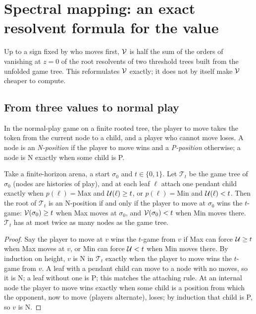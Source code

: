 \section{Spectral mapping: an exact resolvent formula for the value}\label{sec:spectral}

Up to a sign fixed by who moves first, $\mathcal{V}$ is half the sum of the orders of vanishing at $z=0$ of the root resolvents of two threshold trees built from the unfolded game tree. This reformulates $\mathcal{V}$ exactly; it does not by itself make $\mathcal{V}$ cheaper to compute.

\subsection{From three values to normal play}
In the normal-play game on a finite rooted tree, the player to move takes the token from the current node to a child, and a player who cannot move loses. A node is an \emph{N-position} if the player to move wins and a \emph{P-position} otherwise; a node is N exactly when some child is P.

\begin{lemma}\label{lem:threshold}
Take a finite-horizon arena, a start $\sigma_0$ and $t\in\{0,1\}$. Let $\mathcal T_t$ be the game tree of $\sigma_0$ (nodes are histories of play), and at each leaf $\ell$ attach one pendant child exactly when $p(\ell)=\mathrm{Max}$ and $\mathcal{U}(\ell)\ge t$, or $p(\ell)=\mathrm{Min}$ and $\mathcal{U}(\ell)<t$. Then the root of $\mathcal T_t$ is an N-position if and only if the player to move at $\sigma_0$ wins the $t$-game: $\mathcal{V}(\sigma_0)\ge t$ when Max moves at $\sigma_0$, and $\mathcal{V}(\sigma_0)<t$ when Min moves there. $\mathcal T_t$ has at most twice as many nodes as the game tree.
\end{lemma}

\begin{proof}
Say the player to move at $v$ wins the $t$-game from $v$ if Max can force $\mathcal{U}\ge t$ when Max moves at $v$, or Min can force $\mathcal{U}<t$ when Min moves there. By induction on height, $v$ is N in $\mathcal T_t$ exactly when the player to move wins the $t$-game from $v$. A leaf with a pendant child can move to a node with no moves, so it is N; a leaf without one is P; this matches the attaching rule. At an internal node the player to move wins exactly when some child is a position from which the opponent, now to move (players alternate), loses; by induction that child is P, so $v$ is N.
\end{proof}


